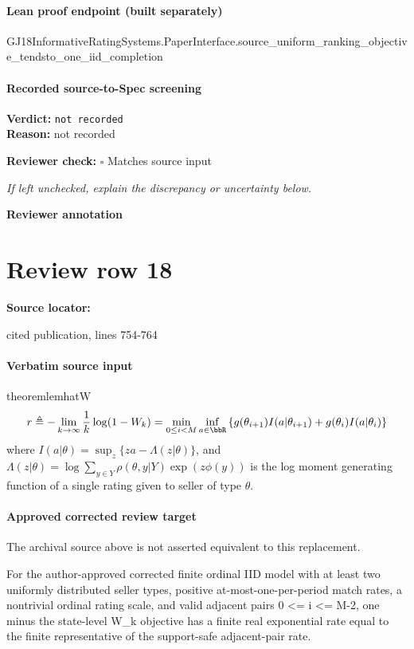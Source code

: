 \documentclass[10pt]{article}
\newcommand{\reviewerbox}{%
  \par\noindent\fbox{\parbox{0.96\linewidth}{\rule{0pt}{0.38in}}}\par
}
\newcommand{\reviewmatch}[1]{%
  \par\noindent\textbf{Reviewer check:} $\square$\; #1\par
  \noindent\emph{If left unchecked, explain the discrepancy or uncertainty below.}\par
}
\begin{document}
\paragraph{Lean proof endpoint (built separately)}\begin{ReviewVerbatim}
GJ18InformativeRatingSystems.PaperInterface.source_uniform_ranking_objective_tendsto_one_iid_completion
\end{ReviewVerbatim}

\paragraph{Recorded source-to-Spec screening}
\textbf{Verdict:} \texttt{not recorded}
\\
\textbf{Reason:} not recorded
\reviewmatch{Matches source input}
\noindent\textbf{Reviewer annotation}\par
\reviewerbox
\clearpage
\hypertarget{source-claim-7415d8df252dd9e8}{}
\section*{Review row 18}
\textbf{Source locator:} {\footnotesize\raggedright cited publication, lines 754-\allowbreak{}764\par}
\paragraph{Verbatim source input}
\begin{ReviewVerbatim}
\begin{restatable}{theorem}{lemhatW}
	\label{lem:hatW}
	\begin{equation}
	\label{eq:rW}
	r \triangleq - \lim_{k \to \infty} \frac{1}{k} \log (1- {W}_k) = \min_{0 \leq i < M} \inf_{a \in \bbR} \left \{ g(\theta_{i+1}) I(a|\theta_{i+1}) + g(\theta_i) I(a|\theta_i)\right\}
	\end{equation}
	where
	$I(a|\theta) = \sup_z \{ za - \Lambda(z|\theta) \}$, and $\Lambda(z|\theta) = \log \sum_{y \in Y} {\rho(\theta, y | Y)} \exp( z \phi(y))$ is the log moment generating function of a single rating given to seller of type $\theta$.
%
%
\end{restatable}
\end{ReviewVerbatim}

\paragraph{Approved corrected review target}
The archival source above is not asserted equivalent to this replacement.
\begin{ReviewVerbatim}
For the author-approved corrected finite ordinal IID model with at least two uniformly distributed seller types, positive at-most-one-per-period match rates, a nontrivial ordinal rating scale, and valid adjacent pairs 0 <= i <= M-2, one minus the state-level W_k objective has a finite real exponential rate equal to the finite representative of the support-safe adjacent-pair rate.
\end{ReviewVerbatim}
\end{document}

